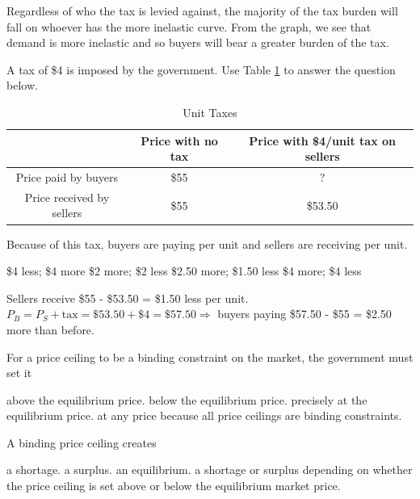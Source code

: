 \documentclass[addpoints,11pt]{exam}
\theoremstyle{definition}
\newcommand{\blank}[0]{\underline{\hspace{3cm}}}
\begin{document}
\begin{questions}
	\begin{solution}
		Regardless of who the tax is levied against, the majority of the tax burden will fall on whoever has the more inelastic curve. From the graph, we see that demand is more inelastic and so buyers will bear a greater burden of the tax.
	\end{solution}
	
	\question A tax of \$4 is imposed by the government. Use Table \ref{MC27} to answer the question below.
	
	\begin{table}[H]
		\caption{Unit Taxes}
		\label{MC27}
		\centering
		\begin{tabular}{  c|c|c} 
			
			& Price with no tax & Price with \$4/unit tax on sellers \\
			\hline
			Price paid by buyers & \$55 & ? \\
			Price received by sellers & \$55 & \$53.50  \\
		\end{tabular}
	\end{table}
	
	Because of this tax, buyers are paying \underline{\hspace{3cm}} per unit and sellers are receiving \blank per unit.
	
	\begin{choices}
		\choice \$4 less; \$4 more
		\choice \$2 more; \$2 less
		\CorrectChoice \$2.50 more; \$1.50 less
		\choice \$4 more; \$4 less
	\end{choices}
	
	\begin{solution}
		Sellers receive \$55 - \$53.50 = \$1.50 less per unit. $P_B = P_S + \text{tax} = \$53.50 + \$4 = \$57.50 \Rightarrow$ buyers paying \$57.50 - \$55 = \$2.50 more than before.
	\end{solution}
	
\question For a price ceiling to be a binding constraint on the market, the government must set it

\begin{choices}
	\choice above the equilibrium price.
	\CorrectChoice below the equilibrium price.
	\choice precisely at the equilibrium price.
	\choice at any price because all price ceilings are binding constraints.
\end{choices}

\question A binding price ceiling creates 

\begin{choices}
	\CorrectChoice a shortage.
	\choice a surplus.
	\choice an equilibrium.
	\choice a shortage or surplus depending on whether the price ceiling is set above or below the equilibrium market price.
\end{choices}
	

\end{questions}
\end{document}
